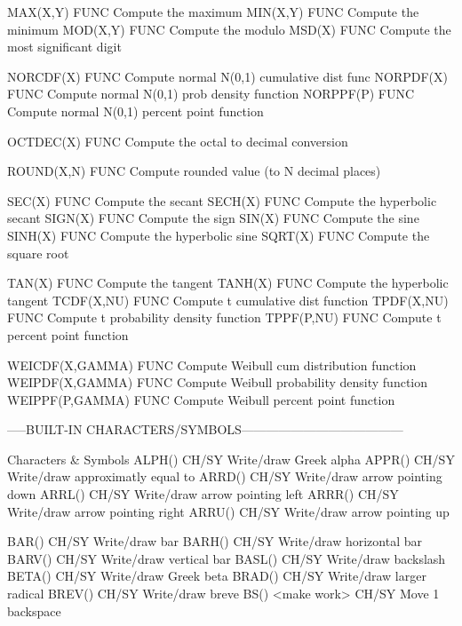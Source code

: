 MAX(X,Y)                    FUNC  Compute the maximum
MIN(X,Y)                    FUNC  Compute the minimum
MOD(X,Y)                    FUNC  Compute the modulo
MSD(X)                      FUNC  Compute the most significant digit

NORCDF(X)                   FUNC  Compute normal N(0,1) cumulative dist func
NORPDF(X)                   FUNC  Compute normal N(0,1) prob density function
NORPPF(P)                   FUNC  Compute normal N(0,1) percent point function

OCTDEC(X)                   FUNC  Compute the octal to decimal conversion

ROUND(X,N)                  FUNC  Compute rounded value (to N decimal places)

SEC(X)                      FUNC  Compute the secant
SECH(X)                     FUNC  Compute the hyperbolic secant
SIGN(X)                     FUNC  Compute the sign
SIN(X)                      FUNC  Compute the sine
SINH(X)                     FUNC  Compute the hyperbolic sine
SQRT(X)                     FUNC  Compute the square root

TAN(X)                      FUNC  Compute the tangent
TANH(X)                     FUNC  Compute the hyperbolic tangent
TCDF(X,NU)                  FUNC  Compute t cumulative dist function
TPDF(X,NU)                  FUNC  Compute t probability density function
TPPF(P,NU)                  FUNC  Compute t percent point function

WEICDF(X,GAMMA)             FUNC  Compute Weibull cum distribution function
WEIPDF(X,GAMMA)             FUNC  Compute Weibull probability density function
WEIPPF(P,GAMMA)             FUNC  Compute Weibull percent point function

-----BUILT-IN CHARACTERS/SYMBOLS---------------------------------------

Characters & Symbols
ALPH()                      CH/SY Write/draw Greek alpha
APPR()                      CH/SY Write/draw approximatly equal to
ARRD()                      CH/SY Write/draw arrow pointing down
ARRL()                      CH/SY Write/draw arrow pointing left
ARRR()                      CH/SY Write/draw arrow pointing right
ARRU()                      CH/SY Write/draw arrow pointing up

BAR()                       CH/SY Write/draw bar
BARH()                      CH/SY Write/draw horizontal bar
BARV()                      CH/SY Write/draw vertical bar
BASL()                      CH/SY Write/draw backslash
BETA()                      CH/SY Write/draw Greek beta
BRAD()                      CH/SY Write/draw larger radical
BREV()                      CH/SY Write/draw breve
BS() <make work>            CH/SY Move 1 backspace

